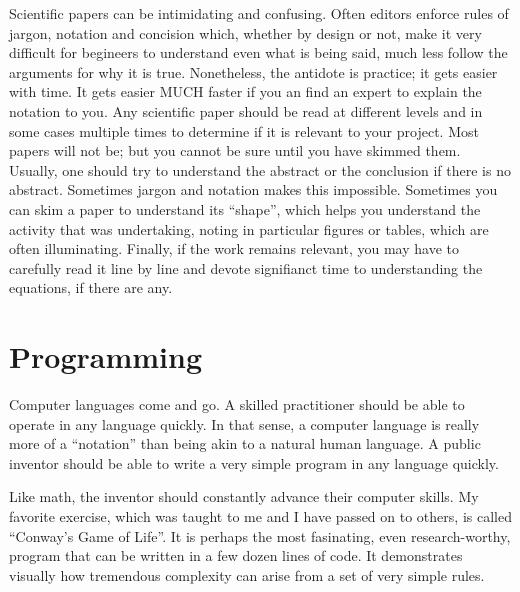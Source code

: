 \documentclass[
	fontsize=10pt, %
	twoside=false, %
	secnumdepth=1, %
]{kaobook}
\begin{document}
Scientific papers can be intimidating and confusing.
Often editors enforce rules of jargon, notation and concision which,
whether by design or not, make it very difficult for begineers to
understand even what is being said, much less follow the arguments for
why it is true.
Nonetheless, the antidote is practice; it gets easier with time.
It gets easier MUCH faster if you an find an expert to explain the notation to
you.
Any scientific paper should be read at different levels and in some cases
multiple times to determine if it is relevant to your project.
Most papers will not be; but you cannot be sure until you have skimmed them.
Usually, one should try to understand the abstract or the
conclusion if there is no abstract. Sometimes jargon and notation makes
this impossible. Sometimes you can skim a paper to understand its ``shape'', which
helps you understand the activity that was undertaking, noting in particular
figures or tables, which are often illuminating.
Finally, if the work remains relevant, you may have to carefully read it line
by line and devote signifianct time to understanding the equations, if there
are any.

\section{Programming}

Computer languages come and go. A skilled practitioner should be
able to operate in any language quickly. In that sense, a computer language
is really more of a ``notation'' than being akin to a natural human language.
A public inventor should be able to write a very simple program in
any language quickly.

Like math, the inventor should constantly advance their computer skills.
My favorite exercise, which was taught to me  and I have passed on to others,
is called ``Conway's Game of Life''. It is perhaps the most fasinating,
even research-worthy,
program that can be written in a few dozen lines of code.
It demonstrates visually how tremendous complexity can arise from a set
of very simple rules.
\end{document}
